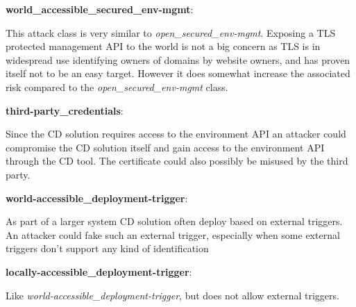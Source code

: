 \textbf{world\_accessible\_secured\_env-mgmt}: \begin{displayquote}
This attack class is very similar to \textit{open\_secured\_env-mgmt}. Exposing a TLS protected management API to the world is not a big concern as TLS is in widespread use identifying owners of domains by website owners\cite{sslpulse}, and has proven itself not to be an easy target. However it does somewhat increase the associated risk compared to the \textit{open\_secured\_env-mgmt} class.
\end{displayquote}

\textbf{third-party\_credentials}: \begin{displayquote}
Since the CD solution requires access to the environment API an attacker could compromise the CD solution itself and gain access to the environment API through the CD tool. The certificate could also possibly be misused by the third party.
\end{displayquote}

\textbf{world-accessible\_deployment-trigger}: \begin{displayquote}
As part of a larger system CD solution often deploy based on external triggers. An attacker could fake such an external trigger, especially when some external triggers don't support any kind of identification\cite{docker-no-id}
\end{displayquote}

\textbf{locally-accessible\_deployment-trigger}: \begin{displayquote}
Like \textit{world-accessible\_deployment-trigger}, but does not allow external triggers.
\end{displayquote}